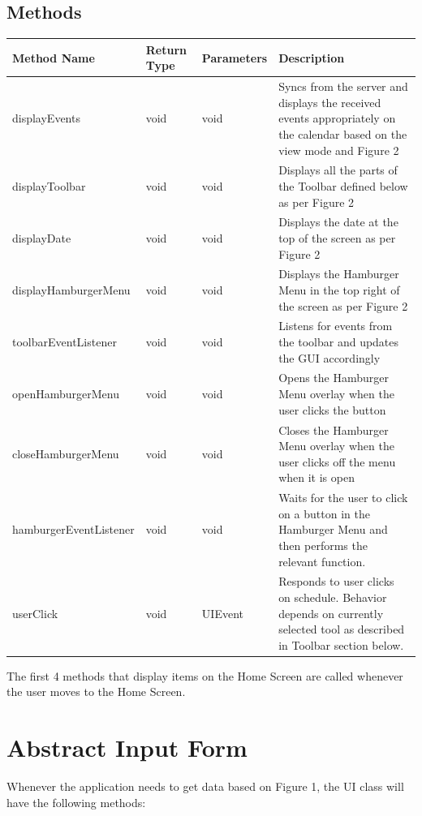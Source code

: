 \documentclass{scrreprt}
\begin{document}
\subsection{Methods}

\begin{center}
\begin{longtable}{ | p{5cm} | p{2cm} | p{3cm} | p{5cm} | }
\hline
\textbf{Method Name} & \textbf{Return Type} & \textbf{Parameters} & \textbf{Description} \\
\hline
displayEvents & void & void & Syncs from the server and displays the received events appropriately on the calendar based on the view mode and Figure 2 \\
\hline
displayToolbar & void & void & Displays all the parts of the Toolbar defined below as per Figure 2 \\
\hline
displayDate & void & void & Displays the date at the top of the screen as per Figure 2 \\
\hline
displayHamburgerMenu & void & void & Displays the Hamburger Menu in the top right of the screen as per Figure 2 \\
\hline
toolbarEventListener & void & void & Listens for events from the toolbar and updates the GUI accordingly \\
\hline
openHamburgerMenu & void & void & Opens the Hamburger Menu overlay when the user clicks the button \\
\hline
closeHamburgerMenu & void & void & Closes the Hamburger Menu overlay when the user clicks off the menu when it is open \\
\hline
hamburgerEventListener & void & void & Waits for the user to click on a button in the Hamburger Menu and then performs the relevant function. \\
\hline
userClick & void & UIEvent & Responds to user clicks on schedule. Behavior depends on currently selected tool as described in Toolbar section below.\\
\hline
\end{longtable}
\end{center}

The first 4 methods that display items on the Home Screen are called whenever the user moves to the Home Screen.

\section{Abstract Input Form}

Whenever the application needs to get data based on Figure 1, the UI class will have the following methods:
\end{document}
